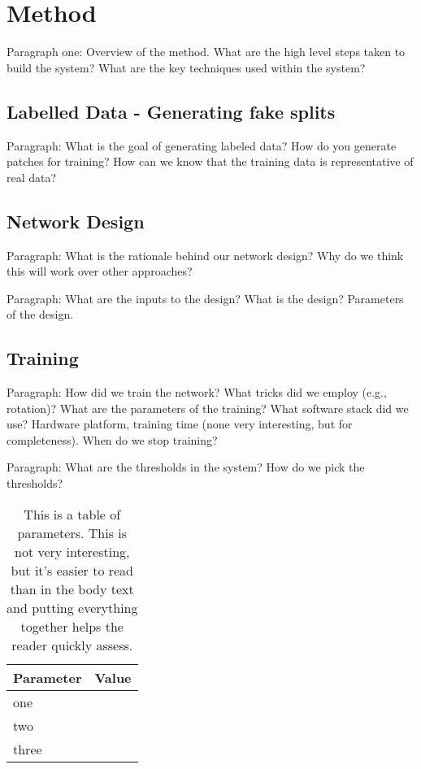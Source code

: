 \section{Method}

Paragraph one: Overview of the method. What are the high level steps taken to build the system? What are the key techniques used within the system?

\subsection{Labelled Data - Generating fake splits}

Paragraph: What is the goal of generating labeled data? How do you generate patches for training? How can we know that the training data is representative of real data?


\subsection{Network Design}

Paragraph: What is the rationale behind our network design? Why do we think this will work over other approaches? 

Paragraph: What are the inputs to the design? What is the design? Parameters of the design.

\subsection{Training}

Paragraph: How did we train the network? What tricks did we employ (e.g., rotation)? What are the parameters of the training? What software stack did we use? Hardware platform, training time (none very interesting, but for completeness). When do we stop training?

Paragraph: What are the thresholds in the system? How do we pick the thresholds?

\begin{table}
\begin{tabular}{ll}
\toprule
Parameter & Value \\
\midrule
one & \\
two & \\
three & \\
\bottomrule
\end{tabular}
\caption{This is a table of parameters. This is not very interesting, but it's easier to read than in the body text and putting everything together helps the reader quickly assess.}
\end{table}